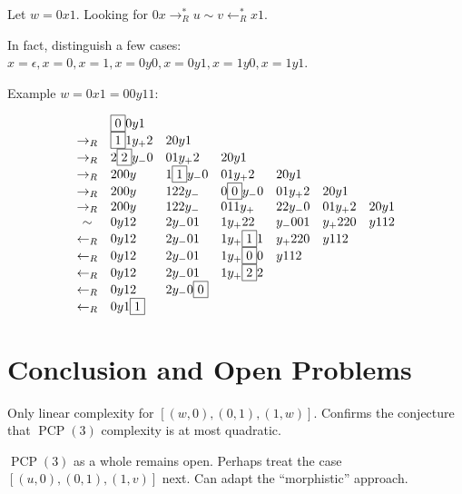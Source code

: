 \documentclass{llncs}
\newcommand{\PCP}{\operatorname{PCP}}
\newcommand{\from}{\leftarrow}
\begin{document}
Let $w = 0x1$. Looking for $0x \to_R^* u \sim v \from_R^* x1$.

In fact, distinguish a few cases:
$x = \epsilon, x=0, x=1, x=0y0, x=0y1, x=1y0, x=1y1$.

Example $w=0x1=00y11$:

\[
\begin{array}{cllllll}
        & \fbox{0} 0 y   1 \\
  \to_R & \fbox{1} 1 y_+ 2 & 2 0 y   1 \\
  \to_R & 2 \fbox{2} y_- 0 & 0 1 y_+ 2 & 2 0 y   1 \\
  \to_R & 2 0 0 y & 1 \fbox{1} y_- 0   & 0 1 y_+ 2 & 2 0 y   1 \\
  \to_R & 2 0 0 y & 1 2 2 y_- & 0 \fbox{0} y_- 0 & 0 1 y_+ 2 & 2 0 y   1 \\
  \to_R & 2 0 0 y & 1 2 2 y_- & 0 1 1 y_+ & 2 2 y_- 0 & 0 1 y_+ 2 & 2 0 y   1 \\
  \sim      & 0 y 1 2 & 2 y_- 0 1 & 1 y_+  2 2 & y_- 0  0 1 & y_+ 2 2 0 & y   1 1 2 \\
  \from_R   & 0 y 1 2 & 2 y_- 0 1 & 1 y_+  \fbox{1} 1 & y_+ 2 2 0 & y   1 1 2 \\
  \from_R   & 0 y 1 2 & 2 y_- 0 1 & 1 y_+  \fbox{0} 0 & y   1 1 2 \\
  \from_R   & 0 y 1 2 & 2 y_- 0 1 & 1 y_+  \fbox{2} 2 \\
  \from_R   & 0 y 1 2 & 2 y_- 0 \fbox{0} \\
  \from_R   & 0 y 1 \fbox{1}
\end{array}
\]


\section{Conclusion and Open Problems}

Only linear complexity for $[(w,0),(0,1),(1,w)]$.
Confirms the conjecture that $\PCP(3)$ complexity is at most quadratic.

$\PCP(3)$ as a whole remains open.
Perhaps treat the case $[(u,0),(0,1),(1,v)]$ next.
Can adapt the ``morphistic'' approach.
\end{document}
